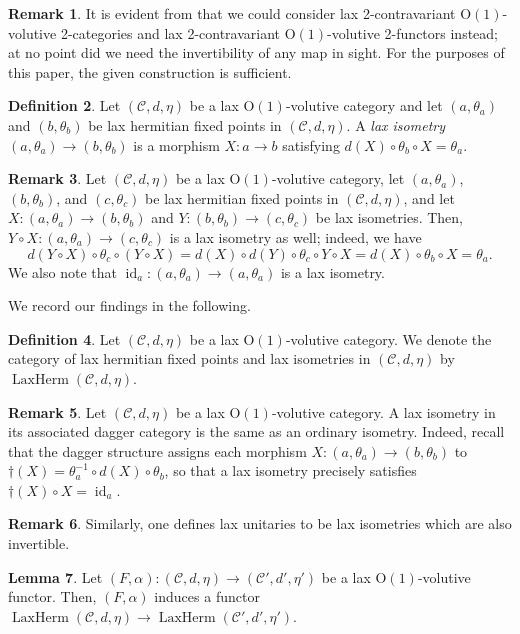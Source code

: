 \documentclass{article}
\newcommand{\id}{\operatorname{id}}%
\newcommand{\LaxHerm}{\operatorname{LaxHerm}}%
\newcommand{\Oone}{\operatorname{O(1)}}
\newcommand{\C}{\mathcal{C}}
\numberwithin{equation}{section}
\theoremstyle{definition}
\newtheorem{definition}{Definition}[subsection]
\newtheorem{lemma}[definition]{Lemma}
\newtheorem{remark}[definition]{Remark}
\theoremstyle{theorem}
\begin{document}
\begin{remark}
    It is evident from  that we could consider lax 2-contravariant $\Oone$-volutive 
    2-categories and lax 2-contravariant $\Oone$-volutive 2-functors instead; at no point did we need the invertibility of any map in sight. For the purposes 
    of this paper, the given construction is sufficient. 
\end{remark}
\begin{definition}\label{Definition: lax isometries}
    Let $(\C,d,\eta)$ be a lax $\Oone$-volutive category and let $(a,\theta_a)$ and $(b,\theta_b)$ be lax hermitian fixed points in $(\C,d,\eta)$. A 
    \emph{lax isometry} $(a,\theta_a) \to (b,\theta_b)$ is a morphism $X \colon a \to b$ satisfying $d(X) \circ \theta_b \circ X = \theta_a$.
\end{definition}
\begin{remark}
    Let $(\C,d,\eta)$ be a lax $\Oone$-volutive category, let $(a,\theta_a)$, $(b,\theta_b)$, and $(c,\theta_c)$ be lax hermitian fixed points in $(\C,d,\eta)$, 
    and let $X \colon (a,\theta_a) \to (b,\theta_b)$ and $Y \colon (b,\theta_b) \to (c,\theta_c)$ be lax isometries. Then, $Y \circ X \colon (a,\theta_a) \to (c,\theta_c)$
    is a lax isometry as well; indeed, we have 
    \begin{equation}
        d(Y \circ X) \circ \theta_c \circ (Y \circ X) = d(X) \circ d(Y) \circ \theta_c \circ Y \circ X = d(X) \circ \theta_b \circ X = \theta_a.
    \end{equation}
    We also note that $\id_a \colon (a,\theta_a) \to (a,\theta_a)$ is a lax isometry. 
\end{remark}
We record our findings in the following.
\begin{definition}\label{Definition: the category of lax hermitian fixed points}
    Let $(\C,d,\eta)$ be a lax $\Oone$-volutive category. We denote the category of lax hermitian fixed points and lax isometries in $(\C,d,\eta)$ by 
    $\LaxHerm(\C,d,\eta)$. 
\end{definition}
\begin{remark}
    Let $(\C,d,\eta)$ be a lax $\Oone$-volutive category. A lax isometry in its associated dagger category is the same as an ordinary isometry. 
    Indeed, recall that the dagger structure assigns each morphism $X \colon (a,\theta_a) \to (b,\theta_b)$ to $\dagger(X) = \theta_a^{-1} \circ d(X) 
    \circ \theta_b$, so that a lax isometry precisely satisfies $\dagger(X)\circ X = \id_a$.
\end{remark}
\begin{remark}
    Similarly, one defines lax unitaries to be lax isometries which are also invertible.
\end{remark}
\begin{lemma}
    Let $(F,\alpha) \colon (\C,d,\eta) \to (\C',d',\eta')$ be a lax $\Oone$-volutive functor. Then, $(F,\alpha)$ induces a functor 
    $\LaxHerm(\C,d,\eta) \to \LaxHerm(\C',d',\eta')$. 
\end{lemma}
\end{document}
